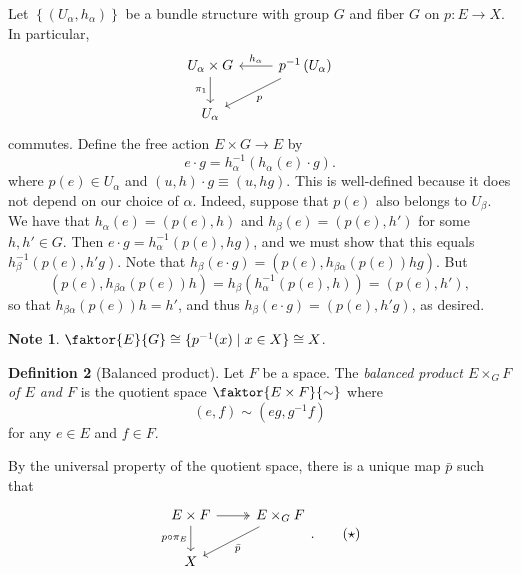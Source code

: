 \documentclass[10pt,letterpaper,cm]{nupset}
\theoremstyle{definition}
\newtheorem{defn}{Definition}[subsection]
\newtheorem{note}[defn]{Note}
\theoremstyle{theorem}
\theoremstyle{remark}
\newcommand{\1}{\mathbb{1}}
\newcommand{\0}{\vec 0}
\begin{document}
Let $\left\{\left(U_{\alpha}, h_{\alpha}\right)\right\}$ be a bundle structure with group $G$ and fiber $G$ on $p: E \to X$. In particular,
\[
\begin{tikzcd}
U_{\alpha}\times G \arrow[d, "\pi_1"'] & p^{-1}\left(U_{\alpha}\right) \arrow[l, "h_{\alpha}"'] \arrow[ld, "p"] \\
U_{\alpha}                             &                                                                                
\end{tikzcd}
\]
commutes. Define the free action $E \times G \to E$ by
\[
e\cdot g = h_{\alpha}^{-1}\left(h_{\alpha}(e)\cdot g\right).
\] where $p(e) \in U_{\alpha}$ and $\left(u,h\right) \cdot g \equiv \left(u, hg\right)$. This is well-defined because it does not depend on our choice of $\alpha$. Indeed, suppose that $p(e)$ also belongs to $U_{\beta}$. We have that $h_{\alpha}(e) =\left(p(e), h\right)$ and $h_{\beta}(e) = \left(p(e), h'\right)$ for some $h, h' \in G$. Then $e\cdot g = h_{\alpha}^{-1}\left(p(e), hg\right)$, and we must show that this equals $h_{\beta}^{-1}\left(p(e), h'g\right)$.  Note that $h_{\beta}\left(e\cdot g\right) = \left(p(e), h_{\beta{\alpha}}(p(e))hg\right)$.  But $$\left(p(e), h_{\beta{\alpha}}(p(e))h\right)  =  h_{\beta}\left(h_{\alpha}^{-1}\left(p(e), h\right)\right) = \left(p(e), h'\right),$$ 
so that $h_{\beta{\alpha}}(p(e))h = h'$, and thus $h_{\beta}\left(e\cdot g\right) = \left(p(e), h'g\right)$, as desired.

\begin{note}\label{quot}
$\faktor{E}{G} \cong \{p^{-1}(x) \mid x \in X \} \cong X$.
\end{note}

\begin{defn}[Balanced product]
Let $F$ be a space. The \textit{balanced product $E\times_G F$ of $E$ and $F$} is the quotient space $ \faktor{E\times F}{\sim}$ where $$\left(e, f\right)  \sim \left(eg, g^{-1}f\right)$$
for any $e\in E$ and $f\in F$.
\end{defn}

By the universal property of the quotient space, there is a unique map $\bar{p}$ such that
\[
\begin{tikzcd}
E\times F \arrow[d, "p\circ \pi_E"'] \arrow[r, two heads] & E\times_GF \arrow[ld, "\bar{p}"] \\
X                                                         &                                 
\end{tikzcd}. \label{eq:indmap}  \tag{$\star$}
\]
\end{document}
